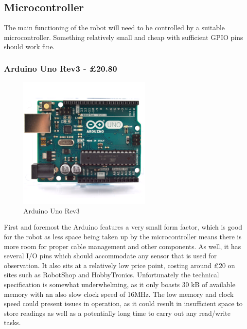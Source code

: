 			
			
				\subsection{Microcontroller}
				The main functioning of the robot will need to be controlled by a suitable microcontroller. Something relatively small and cheap with sufficient GPIO pins should work fine.
				
					\subsubsection{Arduino Uno Rev3 - \pounds{20.80}}
					\begin{figure}[h]
						\centering
						\includegraphics[width=.3\linewidth]{ANALYSIS/arduinounorev3.png}
						\caption{Arduino Uno Rev3}
						\label{fig:arduinounorev3}
					\end{figure}
					First and foremost the Arduino features a very small form factor, which is good for the robot as less space being taken up by the microcontroller means there is more room for proper cable management and other components. As well, it has several I/O pins which should accommodate any sensor that is used for observation. It also sits at a relatively low price point, costing around \pounds{20} on sites such as RobotShop and HobbyTronics. Unfortunately the technical specification is somewhat underwhelming, as it only boasts 30 kB of available memory with an also slow clock speed of 16MHz. The low memory and clock speed could present issues in operation, as it could result in insufficient space to store readings as well as a potentially long time to carry out any read/write tasks.
				
